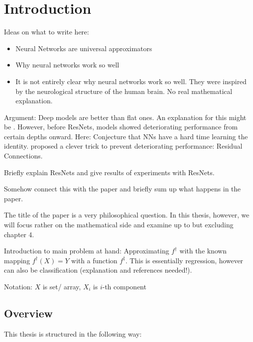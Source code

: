 \section{Introduction}

Ideas on what to write here:
\begin{itemize}
	\item Neural Networks are universal approximators
	\item Why neural networks work so well \cite{lin17}
	\item It is not entirely clear why neural networks work so well. 
	They were inspired by the neurological structure of the human brain.
	No real mathematical explanation.
\end{itemize}

Argument:
Deep models are better than flat ones. An explanation for this might be \cite{lin17}.
However, before ResNets, models showed deteriorating performance from certain depths onward.
Here: Conjecture that NNs have a hard time learning the identity.
\cite{he16} proposed a clever trick to prevent deteriorating performance:
Residual Connections.

Briefly explain ResNets and give results of experiments with ResNets.

Somehow connect this with the paper and briefly sum up what happens in the paper.

The title of the paper is a very philosophical question.
In this thesis, however, we will focus rather on the mathematical side and examine \cite{owhadi20} up to but excluding chapter 4.

Introduction to main problem at hand:
Approximating $f^\dagger$ with the known mapping $f^\dagger(X) = Y$ with a function $f^\ddagger$.
This is essentially regression, however can also be classification (explanation and references needed!).

Notation: $X$ is set/ array, $X_i$ is $i$-th component

\subsection{Overview}
This thesis is structured in the following way: